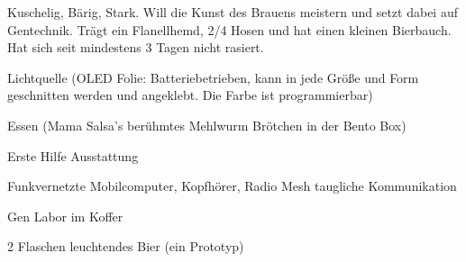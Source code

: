 \begin{npcBox}[title=Das Fass]
    \begin{consequences}
    \item {}
    \item {}
    \item {}
    \end{consequences}

    \begin{npcDescription}
    Kuschelig, Bärig, Stark. Will die Kunst des Brauens meistern und setzt dabei auf Gentechnik. Trägt ein Flanellhemd, 2/4 Hosen und hat einen kleinen Bierbauch. Hat sich seit mindestens 3 Tagen nicht rasiert.
    \end{npcDescription}


    \begin{equipment}
    \item Lichtquelle (OLED Folie: Batteriebetrieben, kann in jede Größe und Form geschnitten werden und angeklebt. Die Farbe ist programmierbar)
    \item Essen (Mama Salsa's berühmtes Mehlwurm Brötchen in der Bento Box)
    \item Erste Hilfe Ausstattung
    \item Funkvernetzte Mobilcomputer, Kopfhörer, Radio Mesh taugliche Kommunikation
    \item Gen Labor im Koffer
    \item 2 Flaschen leuchtendes Bier (ein Prototyp)
    \end{equipment}
\end{npcBox}


